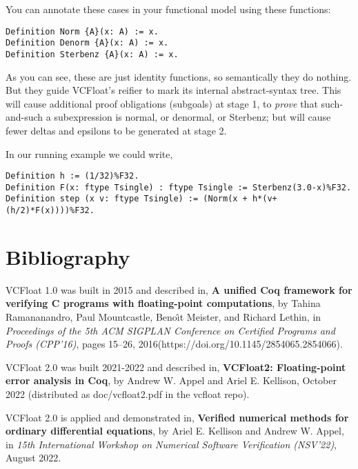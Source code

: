 \documentclass[article]{memoir}
\begin{document}
You can annotate these cases in your functional model using these functions:

\begin{lstlisting}
Definition Norm {A}(x: A) := x.
Definition Denorm {A}(x: A) := x.
Definition Sterbenz {A}(x: A) := x.
\end{lstlisting}

As you can see, these are just identity functions, so semantically they
do nothing.  But they guide VCFloat's reifier to mark its internal
abstract-syntax tree.  This will cause additional proof obligations
(subgoals) at stage 1, to \emph{prove} that such-and-such a subexpression
is normal, or denormal, or Sterbenz; but will cause fewer
deltas and epsilons to be generated at stage 2.

In our running example we could write,
\begin{lstlisting}
Definition h := (1/32)%F32.
Definition F(x: ftype Tsingle) : ftype Tsingle := Sterbenz(3.0-x)%F32.  
Definition step (x v: ftype Tsingle) := (Norm(x + h*(v+(h/2)*F(x))))%F32.
\end{lstlisting}

\chapter{Bibliography}

\quad VCFloat 1.0 was built in 2015 and described in,\newline
\textbf{A unified Coq framework for verifying C programs with floating-point computations}, by Tahina Ramananandro, Paul Mountcastle, Beno\^{\i}t  Meister, and Richard Lethin, in \emph{Proceedings of the 5th ACM SIGPLAN Conference on Certified Programs and Proofs (CPP'16)}, pages 15--26, 2016\newline (https://doi.org/10.1145/2854065.2854066).
\vspace\baselineskip

VCFloat 2.0 was built 2021-2022 and described in,\newline
\textbf{VCFloat2: Floating-point error analysis in Coq},
by Andrew W. Appel and Ariel E. Kellison,
October 2022  (distributed as doc/vcfloat2.pdf in the vcfloat repo).
\vspace\baselineskip

VCFloat 2.0 is applied and demonstrated in,\newline
\textbf{Verified numerical methods for ordinary differential equations},
by Ariel E. Kellison and Andrew W. Appel,
in \emph{15th International Workshop on Numerical Software Verification (NSV'22)}, August 2022.
\end{document}
